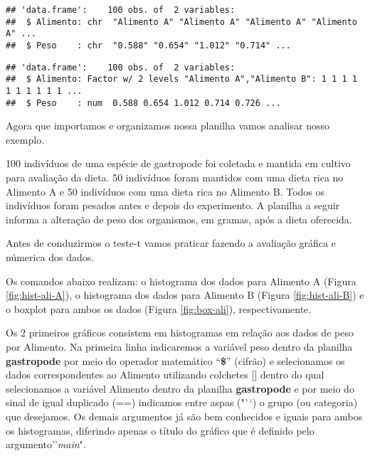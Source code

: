 \documentclass[14pt,titlepage, oneside, openany, a4paper]{book}
\newenvironment{Shaded}{\begin{snugshade}}{\end{snugshade}}
\newcommand{\KeywordTok}[1]{\textcolor[rgb]{0.13,0.29,0.53}{\textbf{#1}}}
\newcommand{\NormalTok}[1]{#1}
\newcommand{\OperatorTok}[1]{\textcolor[rgb]{0.81,0.36,0.00}{\textbf{#1}}}
\newcommand{\StringTok}[1]{\textcolor[rgb]{0.31,0.60,0.02}{#1}}
\begin{document}
\begin{verbatim}
## 'data.frame':    100 obs. of  2 variables:
##  $ Alimento: chr  "Alimento A" "Alimento A" "Alimento A" "Alimento A" ...
##  $ Peso    : chr  "0.588" "0.654" "1.012" "0.714" ...
\end{verbatim}

\begin{Shaded}
\end{Shaded}

\begin{verbatim}
## 'data.frame':    100 obs. of  2 variables:
##  $ Alimento: Factor w/ 2 levels "Alimento A","Alimento B": 1 1 1 1 1 1 1 1 1 1 ...
##  $ Peso    : num  0.588 0.654 1.012 0.714 0.726 ...
\end{verbatim}

Agora que importamos e organizamos nossa planilha vamos analisar nosso exemplo.

100 indivíduos de uma espécie de gastropode foi coletada e mantida em cultivo para avaliação da dieta. 50 indivíduos foram mantidos com uma dieta rica no Alimento A e 50 indivíduos com uma dieta rica no Alimento B. Todos os indivíduos foram pesados antes e depois do experimento. A planilha a seguir informa a alteração de peso dos organismos, em gramas, após a dieta oferecida.

Antes de conduzirmos o teste-t vamos praticar fazendo a avaliação gráfica e númerica dos dados.

Os comandos abaixo realizam: o histograma dos dados para Alimento A (Figura \ref{fig:hist-ali-A}), o histograma dos dados para Alimento B (Figura \ref{fig:hist-ali-B}) e o boxplot para ambos os dados (Figura \ref{fig:box-ali}), respectivamente.

Os 2 primeiros gráficos consistem em histogramas em relação aos dados de peso por Alimento. Na primeira linha indicaremos a variável peso dentro da planilha \textbf{gastropode} por meio do operador matemático ``\textbf{\$}'' (cifrão) e selecionamos os dados correspondentes ao Alimento utilizando colchetes {[}{]} dentro do qual selecionamos a variável Alimento dentro da planilha \textbf{gastropode} e por meio do sinal de igual duplicado (==) indicamos entre aspas ("``) o grupo (ou categoria) que desejamos. Os demais argumentos já são bem conhecidos e iguais para ambos os histogramas, diferindo apenas o título do gráfico que é definido pelo argumento''\emph{main}".
\end{document}
